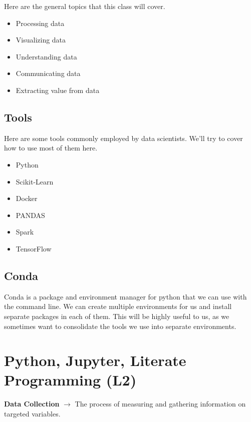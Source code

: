\documentclass[english, 10pt]{article}
\begin{document}
Here are the general topics that this class will cover.

\begin{itemize}
	\item Processing data
	\item Visualizing data
	\item Understanding data
	\item Communicating data
	\item Extracting value from data
\end{itemize}

\subsection{Tools}

Here are some tools commonly employed by data scientists. We'll try to cover how to use most of them here.

\begin{itemize}
	\item Python
	\item Scikit-Learn
	\item Docker
	\item PANDAS
	\item Spark
	\item TensorFlow
\end{itemize}

\subsection{Conda}

Conda is a package and environment manager for python that we can use with the command line.
We can create multiple environments for us and install separate packages in each of them.
This will be highly useful to us, as we sometimes want to consolidate the tools we use into separate environments.

\section{Python, Jupyter, Literate Programming (L2)}

\begin{tcolorbox}[title=Definition:,colframe=red!75!black,colback=red!5!white,arc=0pt,fonttitle=\bfseries]
\textbf{Data Collection} $\rightarrow$ The process of measuring and gathering information on targeted variables.
\end{tcolorbox}
\end{document}
